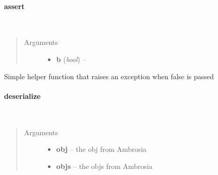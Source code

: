 \documentclass[letterpaper,10pt,english]{sphinxmanual}
\begin{document}
\paragraph{assert}
\label{ambrosia_web.util:assert}

\begin{fulllineitems}
\label{ambrosia_web.util:ambrosia_web.util.assert}~\begin{quote}\begin{description}
\item[{Arguments}] \leavevmode\begin{itemize}
\item {} 
\textbf{b} (\emph{bool}) -- 

\end{itemize}

\end{description}\end{quote}

\end{fulllineitems}


Simple helper function that raises an exception when false is passed


\paragraph{deserialize}
\label{ambrosia_web.util:deserialize}

\begin{fulllineitems}
\label{ambrosia_web.util:ambrosia_web.util.deserialize}~\begin{quote}\begin{description}
\item[{Arguments}] \leavevmode\begin{itemize}
\item {} 
\textbf{obj} -- the obj from Ambrosia

\item {} 
\textbf{objs} -- the objs from Ambrosia

\end{itemize}

\end{description}\end{quote}

\end{fulllineitems}
\end{document}
